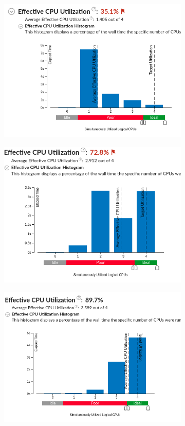 \documentclass[12pt]{article}
\begin{document}
\begin{figure}[h!]
	\centering
	\begin{subfigure}[b]{0.32\linewidth}
		\includegraphics[width=\linewidth]{PR/03_04.png}
	\end{subfigure}
	\begin{subfigure}[b]{0.32\linewidth}
		\includegraphics[width=\linewidth]{PR/04_04.png}
	\end{subfigure}
	\begin{subfigure}[b]{0.32\linewidth}
		\includegraphics[width=\linewidth]{PR/05_04.png}

\end{subfigure}
\end{figure}
\end{document}
